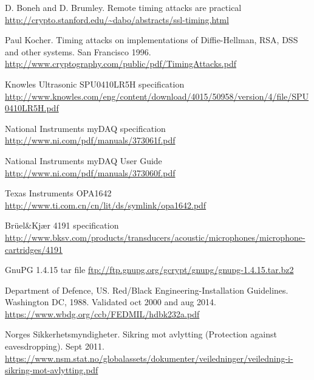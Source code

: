 \begin{thebibliography}{18}

 D. Boneh and D. Brumley. Remote timing attacks are practical
\url{http://crypto.stanford.edu/~dabo/abstracts/ssl-timing.html}

 Paul Kocher. Timing attacks on implementations of Diffie-Hellman, RSA, DSS and other systems. San Francisco 1996.
\url{http://www.cryptography.com/public/pdf/TimingAttacks.pdf}


 Knowles Ultrasonic SPU0410LR5H specification
\url{http://www.knowles.com/eng/content/download/4015/50958/version/4/file/SPU0410LR5H.pdf}

 National Instruments myDAQ specification
\url{http://www.ni.com/pdf/manuals/373061f.pdf}

 National Instruments myDAQ User Guide
\url{http://www.ni.com/pdf/manuals/373060f.pdf}

 Texas Instruments OPA1642
\url{http://www.ti.com.cn/cn/lit/ds/symlink/opa1642.pdf}


 Brüel\&Kjær 4191 specification
\url{http://www.bksv.com/products/transducers/acoustic/microphones/microphone-cartridges/4191}


 GnuPG 1.4.15 tar file
\url{ftp://ftp.gnupg.org/gcrypt/gnupg/gnupg-1.4.15.tar.bz2}



 Department of Defence, US. Red/Black Engineering-Installation Guidelines. Washington DC, 1988. Validated oct 2000 and aug 2014.
\url{https://www.wbdg.org/ccb/FEDMIL/hdbk232a.pdf}

 Norges Sikkerhetsmyndigheter. Sikring mot avlytting (Protection against eavesdropping). Sept 2011. 
\url{https://www.nsm.stat.no/globalassets/dokumenter/veiledninger/veiledning-i-sikring-mot-avlytting.pdf}

\end{thebibliography}